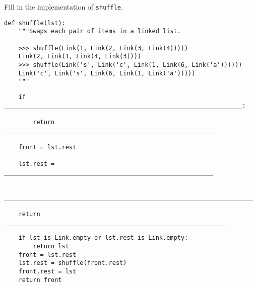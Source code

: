 \begin{blocksection}
\question Fill in the implementation of \lstinline$shuffle$.

\begin{lstlisting}
def shuffle(lst):
    """Swaps each pair of items in a linked list.

    >>> shuffle(Link(1, Link(2, Link(3, Link(4)))))
    Link(2, Link(1, Link(4, Link(3))))
    >>> shuffle(Link('s', Link('c', Link(1, Link(6, Link('a'))))))
    Link('c', Link('s', Link(6, Link(1, Link('a')))))
    """
\end{lstlisting}

\ifprintanswers\else
\begin{lstlisting}
    if __________________________________________________________________:

        return __________________________________________________________

    front = lst.rest

    lst.rest = __________________________________________________________

    _____________________________________________________________________

    return ______________________________________________________________
\end{lstlisting}
\fi

\begin{solution}
\begin{lstlisting}
    if lst is Link.empty or lst.rest is Link.empty:
        return lst
    front = lst.rest
    lst.rest = shuffle(front.rest)
    front.rest = lst
    return front
\end{lstlisting}
\end{solution}
\end{blocksection}
